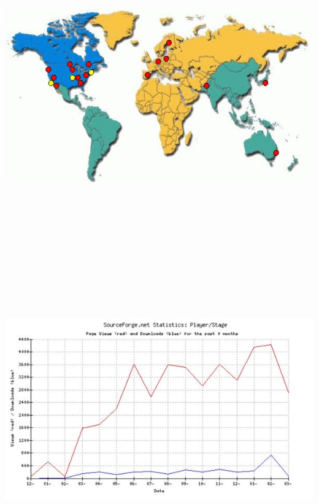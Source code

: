\documentclass[30pt,landscape,magscalefonts]{foils}
\newcommand{\foilheadc}[1]{\foilhead{\Large \textcolor{myred}{#1}}\vspace*{-2em}}
\begin{document}
\foilheadc{Usage}
\begin{center}
\includegraphics[height=130mm]{usage-map.jpg}
\end{center}

\foilheadc{Usage (cont'd)}
\begin{center}
\includegraphics[height=130mm]{stats_graph_blur.jpg}
\end{center}
\end{document}

